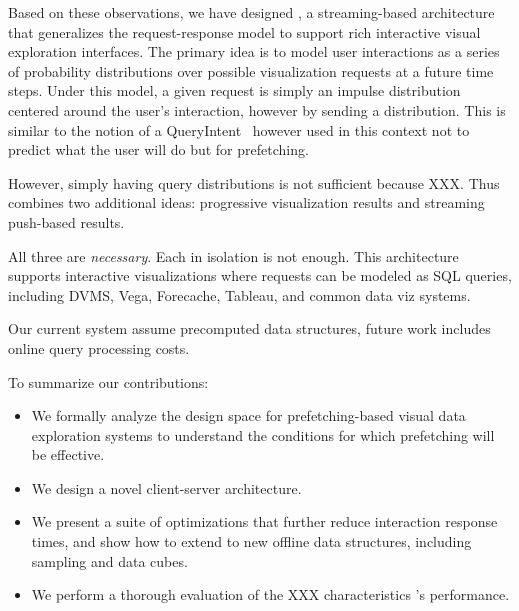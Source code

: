 Based on these observations, we have designed \sys, a streaming-based architecture that generalizes the request-response model to support rich interactive visual exploration interfaces.  The primary idea is to model user interactions as a series of probability distributions over possible visualization requests at a future time steps.  Under this model, a given request is simply an impulse distribution centered around the user's interaction, however by sending a distribution.  This is similar to the notion of a QueryIntent~\cite{ebenstein2016fluxquery} however used in this context not to predict what the user will do but for prefetching.

However, simply having query distributions is not sufficient because XXX.  Thus \sys combines two additional ideas: progressive visualization results and streaming push-based results. 

All three are {\it necessary}.  Each in isolation is not enough.   This architecture supports interactive visualizations where requests can be modeled as SQL queries, including DVMS, Vega, Forecache, Tableau, and common data viz systems.


Our current system assume precomputed data structures, future work includes online query processing costs.


To summarize our contributions:

\begin{itemize}[leftmargin=*, topsep=0mm, itemsep=0mm]

\item We formally analyze the design space for prefetching-based visual data exploration systems to understand the conditions for which prefetching will be effective.

\item We design a novel client-server architecture.

\item We present a suite of optimizations that further reduce interaction response times, and show how to extend to new offline data structures, including sampling and data cubes.

\item We perform a thorough evaluation of the XXX characteristics \sys's performance.  

\end{itemize}
